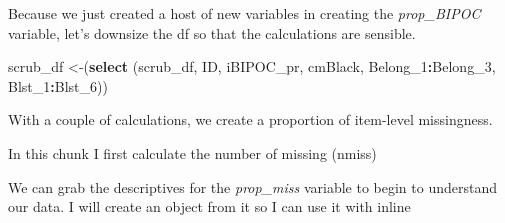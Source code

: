 \documentclass[
  11pt,
]{book}
\newenvironment{Shaded}{\begin{snugshade}}{\end{snugshade}}
\newcommand{\AttributeTok}[1]{\textcolor[rgb]{0.27,0.27,0.27}{#1}}
\newcommand{\CommentTok}[1]{\textcolor[rgb]{0.37,0.37,0.37}{\textit{#1}}}
\newcommand{\DecValTok}[1]{\textcolor[rgb]{0.06,0.06,0.06}{#1}}
\newcommand{\FunctionTok}[1]{\textcolor[rgb]{0.27,0.27,0.27}{\textbf{#1}}}
\newcommand{\NormalTok}[1]{#1}
\newcommand{\OtherTok}[1]{\textcolor[rgb]{0.37,0.37,0.37}{#1}}
\newcommand{\SpecialCharTok}[1]{\textcolor[rgb]{0.43,0.43,0.43}{\textbf{#1}}}
\begin{document}
Because we just created a host of new variables in creating the \emph{prop\_BIPOC} variable, let's downsize the df so that the calculations are sensible.

\begin{Shaded}
\begin{Highlighting}[]
\NormalTok{scrub\_df }\OtherTok{\textless{}{-}}\NormalTok{(}\FunctionTok{select}\NormalTok{ (scrub\_df, ID, iBIPOC\_pr, cmBlack, Belong\_1}\SpecialCharTok{:}\NormalTok{Belong\_3, Blst\_1}\SpecialCharTok{:}\NormalTok{Blst\_6))}
\end{Highlighting}
\end{Shaded}

With a couple of calculations, we create a proportion of item-level missingness.

In this chunk I first calculate the number of missing (nmiss)

\begin{Shaded}
\end{Shaded}

We can grab the descriptives for the \emph{prop\_miss} variable to begin to understand our data. I will create an object from it so I can use it with inline

\begin{Shaded}
\end{Shaded}
\end{document}
